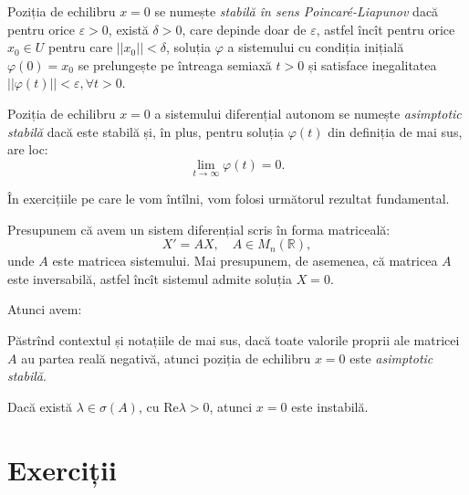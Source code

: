 \begin{definition}\label{def:stabil}
  Poziția de echilibru $ x = 0 $ se numește \emph{stabilă în sens Poincar\'e-Liapunov}
  dacă pentru orice $ \varepsilon > 0 $, există $ \delta > 0 $, care depinde
  doar de $ \varepsilon $, astfel încît pentru orice $ x_0 \in U $ pentru care
  $ ||x_0|| < \delta $, soluția $ \varphi $ a sistemului cu condiția inițială
  $ \varphi(0) = x_0 $ se prelungește pe întreaga semiaxă $ t > 0 $ și
  satisface inegalitatea $ || \varphi(t) || < \varepsilon, \forall t > 0 $.

\end{definition}

\begin{definition}\label{def:stabil-as}
  Poziția de echilibru $ x = 0 $ a sistemului diferențial autonom se
  numește \emph{asimptotic stabilă} dacă este stabilă și, în plus, pentru
  soluția $ \varphi(t) $ din definiția de mai sus, are loc:
  \[
    \lim_{t \to \infty} \varphi(t) = 0.
  \]
\end{definition}

În exercițiile pe care le vom întîlni, vom folosi următorul rezultat fundamental.

Presupunem că avem un sistem diferențial scris în forma matriceală:
\[
  X' = AX, \quad A \in M_n(\mathbb{R}),
\]
unde $ A $ este matricea sistemului. Mai presupunem, de asemenea, că
matricea $ A $ este inversabilă, astfel încît sistemul admite soluția
$ X = 0 $.

Atunci avem:
\begin{theorem}\label{thm:poi-li}
  Păstrînd contextul și notațiile de mai sus, dacă toate valorile proprii
  ale matricei $ A $ au partea reală negativă, atunci poziția de e\-chi\-li\-bru
  $ x = 0 $ este \emph{a\-simp\-to\-tic stabilă}.

  Dacă există $ \lambda \in \sigma(A) $, cu $\mathrm{Re}\lambda > 0 $, atunci
  $ x = 0 $ este instabilă.
\end{theorem}


\section{Exerciții}

